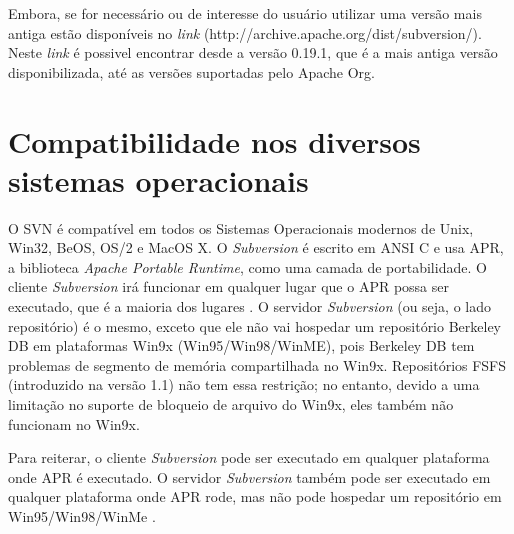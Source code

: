   Embora, se for necessário ou de interesse do usuário utilizar uma versão mais antiga estão disponíveis no \textit{link} (http://archive.apache.org/dist/subversion/). Neste \textit{link} é possivel encontrar desde a versão 0.19.1, que é a mais antiga versão disponibilizada, até as versões suportadas pelo Apache Org.

\section{Compatibilidade nos diversos sistemas operacionais}

  O SVN é compatível em todos os Sistemas Operacionais modernos de Unix, Win32, BeOS, OS/2 e MacOS X. O \textit{Subversion} é escrito em ANSI C e usa APR, a biblioteca \textit{Apache Portable Runtime}, como uma camada de portabilidade. O cliente \textit{Subversion} irá funcionar em qualquer lugar que o APR possa ser executado, que é a maioria dos lugares \cite{apache-faq}. O servidor \textit{Subversion} (ou seja, o lado repositório) é o mesmo, exceto que ele não vai hospedar um repositório Berkeley DB em plataformas Win9x (Win95/Win98/WinME), pois Berkeley DB tem problemas de segmento de memória compartilhada no Win9x. Repositórios FSFS (introduzido na versão 1.1) não tem essa restrição; no entanto, devido a uma limitação no suporte de bloqueio de arquivo do Win9x, eles também não funcionam no Win9x.

  Para reiterar, o cliente \textit{Subversion} pode ser executado em qualquer plataforma onde APR é executado. O servidor \textit{Subversion} também pode ser executado em qualquer plataforma onde APR rode, mas não pode hospedar um repositório em Win95/Win98/WinMe \cite{apache-faq}.
